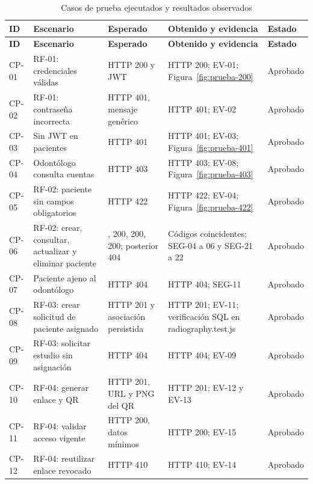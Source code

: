 \documentclass[12pt,letterpaper]{report}
\begin{document}
\begingroup
\footnotesize
\setlength{\tabcolsep}{3pt}
\renewcommand{\arraystretch}{1.2}
\begin{longtable}{@{}>{\raggedright\arraybackslash}p{.09\linewidth}>{\raggedright\arraybackslash}p{.24\linewidth}>{\raggedright\arraybackslash}p{.21\linewidth}>{\raggedright\arraybackslash}p{.27\linewidth}>{\raggedright\arraybackslash}p{.11\linewidth}@{}}
\caption{Casos de prueba ejecutados y resultados observados}\label{tab:pruebas-reales}\\
\toprule
\textbf{ID}&\textbf{Escenario}&\textbf{Esperado}&\textbf{Obtenido y evidencia}&\textbf{Estado}\\\midrule
\endfirsthead
\toprule
\textbf{ID}&\textbf{Escenario}&\textbf{Esperado}&\textbf{Obtenido y evidencia}&\textbf{Estado}\\\midrule
\endhead
\bottomrule\endlastfoot
CP-01 & RF-01: credenciales válidas & HTTP 200 y JWT & HTTP 200; EV-01; Figura~\ref{fig:prueba-200} & Aprobado \\
CP-02 & RF-01: contraseña incorrecta & HTTP 401, mensaje genérico & HTTP 401; EV-02 & Aprobado \\
CP-03 & Sin JWT en pacientes & HTTP 401 & HTTP 401; EV-03; Figura~\ref{fig:prueba-401} & Aprobado \\
CP-04 & Odontólogo consulta cuentas & HTTP 403 & HTTP 403; EV-08; Figura~\ref{fig:prueba-403} & Aprobado \\
CP-05 & RF-02: paciente sin campos obligatorios & HTTP 422 & HTTP 422; EV-04; Figura~\ref{fig:prueba-422} & Aprobado \\
CP-06 & RF-02: crear, consultar, actualizar y eliminar paciente & 201, 200, 200, 200; posterior 404 & Códigos coincidentes; SEG-04 a 06 y SEG-21 a 22 & Aprobado \\
CP-07 & Paciente ajeno al odontólogo & HTTP 404 & HTTP 404; SEG-11 & Aprobado \\
CP-08 & RF-03: crear solicitud de paciente asignado & HTTP 201 y asociación persistida & HTTP 201; EV-11; verificación SQL en radiography.test.js & Aprobado \\
CP-09 & RF-03: solicitar estudio sin asignación & HTTP 404 & HTTP 404; EV-09 & Aprobado \\
CP-10 & RF-04: generar enlace y QR & HTTP 201, URL y PNG del QR & HTTP 201; EV-12 y EV-13 & Aprobado \\
CP-11 & RF-04: validar acceso vigente & HTTP 200, datos mínimos & HTTP 200; EV-15 & Aprobado \\
CP-12 & RF-04: reutilizar enlace revocado & HTTP 410 & HTTP 410; EV-14 & Aprobado \\

\end{longtable}
\end{document}
